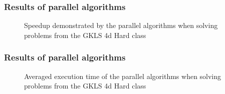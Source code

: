 \documentclass[aspectratio=1610]{beamer}
\begin{document}
\begin{frame}
  \frametitle{Results of parallel algorithms}
  \begin{figure}[ht]
    \centering
    \caption{Speedup demonstrated by the parallel algorithms when solving problems from the GKLS 4d Hard class}
  \end{figure}
\end{frame}

\begin{frame}
  \frametitle{Results of parallel algorithms}
  \begin{figure}[ht]
    \centering
    \caption{Averaged execution time of the parallel algorithms when solving problems from the GKLS 4d Hard class}
  \end{figure}
\end{frame}
\end{document}
